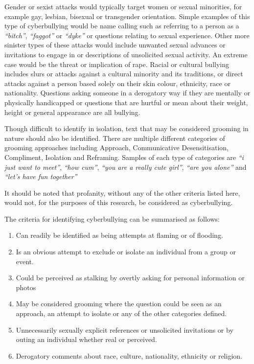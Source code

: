 Gender or sexist attacks would typically target women or sexual minorities, for example gay, lesbian, bisexual or transgender orientation. Simple examples of this type of cyberbullying would be name calling such as referring to a person as a \textit{``bitch''}, \textit{``faggot''} or \textit{``dyke''} or questions relating to sexual experience. Other more sinister types of these attacks would include unwanted sexual advances or invitations to engage in or descriptions of unsolicited sexual activity. An extreme case would be the threat or implication of rape. Racial or cultural bullying includes slurs or attacks against a cultural minority and its traditions, or direct attacks against a person based solely on their skin colour, ethnicity, race or nationality. Questions asking someone in a derogatory way if they are mentally or physically handicapped or questions that are hurtful or mean about their weight, height or general appearance are all bullying.

Though difficult to identify in isolation, text that may be considered grooming in nature should also be identified. There are multiple different categories of grooming approaches including Approach, Communicative Desensitisation, Compliment, Isolation and Reframing. Samples of each type of categories are \textit{``i just want to meet''}, \textit{``how cum''}, \textit{``you are a really cute girl''}, \textit{``are you alone''} and \textit{``let's have fun together''}  \cite{kontostathis_chatcoder:_2009}

It should be noted that profanity, without any of the other criteria listed here, would not, for the purposes of this research, be considered as cyberbullying.

The criteria for identifying cyberbullying can be summarised as follows:

\begin{enumerate}

	\item Can readily be identified as being attempts at flaming or of flooding.
	\item Is an obvious attempt to exclude or isolate an individual from a group or event.
	\item Could be perceived as stalking by overtly asking for personal information or photos 
	\item May be considered grooming where the question could be seen as an approach, an attempt to isolate or any of the other categories defined.
	\item Unnecessarily sexually explicit references or unsolicited invitations or by outing an individual whether real or perceived.
	\item Derogatory comments about race, culture, nationality, ethnicity or religion.

\end{enumerate}

